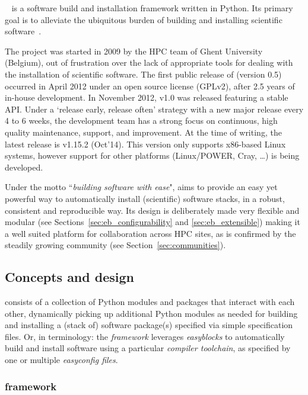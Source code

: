 \easybuild{}~\cite{EasyBuildSC12} is a software build and installation framework
written in Python. Its primary goal is to alleviate the ubiquitous burden of
building and installing scientific software~\cite{Dubois03}.

The \easybuild{} project was started in 2009 by the HPC team of Ghent
University (Belgium), out of frustration over the lack of appropriate tools for
dealing with the installation of scientific software. The first public release of
\easybuild{} (version 0.5) occurred in April 2012 under an open source license
(GPLv2), after 2.5 years of in-house
development. In November 2012, \easybuild{} v1.0 was released featuring
a stable API. Under a `release early, release often' strategy with a new major
release every 4 to 6 weeks, the development team has a strong focus on continuous,
high quality maintenance, support, and improvement. At the time of
writing, the latest release is \easybuild{} v1.15.2 (Oct'14). This version
only supports x86-based Linux systems, however support for other platforms
(Linux/POWER, Cray, \ldots) is being developed.

Under the motto ``\emph{building software with ease}", \easybuild{} aims to provide an easy
yet powerful way to automatically install (scientific) software stacks, in a robust,
consistent and reproducible way. Its design is deliberately made very flexible and
modular (see Sections~\ref{sec:eb_configurability} and \ref{sec:eb_extensible})
making it a well suited platform for collaboration across HPC sites, as is
confirmed by the steadily growing \easybuild{} community (see
Section~\ref{sec:communities}).

\subsection{Concepts and design}

\easybuild{} consists of a collection of Python modules and packages that
interact with each other, dynamically picking up additional Python modules as needed
for building and installing a (stack of) software package(s) specified via simple
specification files. Or, in \easybuild{} terminology: the \easybuild{}
\emph{framework} leverages \emph{easyblocks} to automatically build and install
software using a particular \emph{compiler toolchain}, as specified by one or
multiple \emph{easyconfig files}.

\subsubsection{\easybuild{} framework}
\label{sec:eb_framework}

